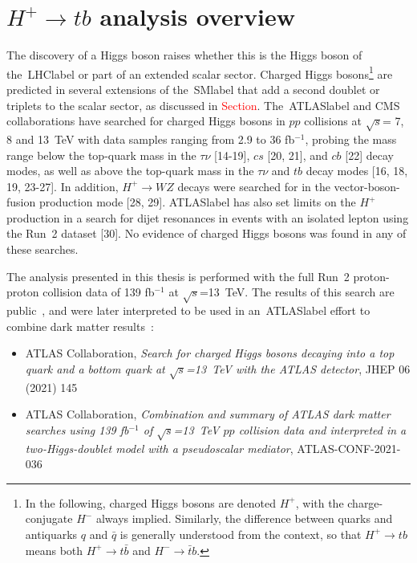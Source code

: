 \chapter{$H^+\to tb$ analysis overview}

The discovery of a Higgs boson raises whether this is the Higgs boson of the~\acrshort{LHClabel} or part of an extended scalar sector. Charged Higgs bosons\footnote{In the following, charged Higgs bosons are denoted $H^+$, with the charge-conjugate $H^-$ always implied. Similarly, the difference between quarks and antiquarks $q$ and $\bar{q}$ is generally understood from the context, so that $H^+\to tb$ means both $H^+\to t\bar{b}$ and $H^-\to \bar{t}b$.} are predicted in several extensions of the~\acrshort{SMlabel} that add a second doublet or triplets to the scalar sector, as discussed in \textcolor{red}{Section}. 
The~\acrshort{ATLASlabel} and CMS collaborations have searched for charged Higgs bosons in $pp$ collisions at $\sqrt{s}$= 7, 8 and 13~TeV with data samples ranging from 2.9 to 36 fb$^{-1}$, probing the mass range below the top-quark mass in the $\tau\nu$ [14-19], $cs$ [20, 21], and $cb$ [22] decay modes, as well as above the top-quark mass in the $\tau\nu$ and $tb$ decay modes [16, 18, 19, 23-27]. In addition, $H^+\to WZ$ decays were searched for in the vector-boson-fusion production mode [28, 29]. \acrshort{ATLASlabel} has also set limits on the $H^+$ production in a search for dijet resonances in events with an isolated lepton using the Run~2 dataset [30]. No evidence of charged Higgs bosons was found in any of these searches.
    
The analysis presented in this thesis is performed with the full Run~2 proton-proton collision data of 139 fb$^{-1}$ at $\sqrt{s}$=13~TeV. The results of this search are public~\cite{Hpluspaper}, and were later interpreted to be used in an~\acrshort{ATLASlabel} effort to combine dark matter results~\cite{Hpluscomb}:

\begin{itemize}
    \item ATLAS Collaboration, \textit{Search for charged Higgs bosons decaying into a top quark and a bottom quark at $\sqrt{s}$=13~TeV with the ATLAS detector}, JHEP 06 (2021) 145
    
    \item ATLAS Collaboration, \textit{Combination and summary of ATLAS dark matter searches using 139 fb$^{-1}$ of $\sqrt{s}$=13~TeV $pp$ collision data and interpreted in a two-Higgs-doublet model with a pseudoscalar mediator}, ATLAS-CONF-2021-036
\end{itemize}

